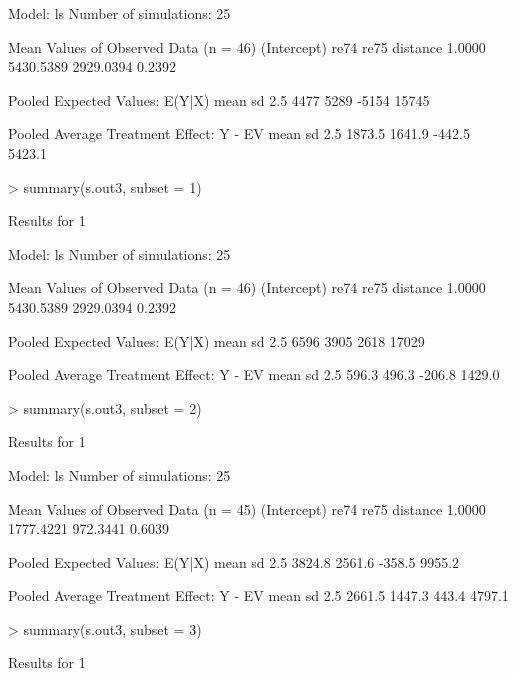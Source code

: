 \begin{enumerate}
\begin{Schunk}
\begin{Soutput}
  Model: ls 
  Number of simulations: 25 

Mean Values of Observed Data (n = 46) 
(Intercept)        re74        re75    distance 
     1.0000   5430.5389   2929.0394      0.2392 

Pooled Expected Values: E(Y|X)
 mean    sd  2.5% 97.5% 
 4477  5289 -5154 15745 

Pooled Average Treatment Effect: Y - EV
  mean     sd   2.5%  97.5% 
1873.5 1641.9 -442.5 5423.1 

\end{Soutput}
\begin{Sinput}
> summary(s.out3, subset = 1)
\end{Sinput}
\begin{Soutput}

Results for 1 

  Model: ls 
  Number of simulations: 25 

Mean Values of Observed Data (n = 46) 
(Intercept)        re74        re75    distance 
     1.0000   5430.5389   2929.0394      0.2392 

Pooled Expected Values: E(Y|X)
 mean    sd  2.5% 97.5% 
 6596  3905  2618 17029 

Pooled Average Treatment Effect: Y - EV
  mean     sd   2.5%  97.5% 
 596.3  496.3 -206.8 1429.0 


\end{Soutput}
\begin{Sinput}
> summary(s.out3, subset = 2)
\end{Sinput}
\begin{Soutput}

Results for 1 

  Model: ls 
  Number of simulations: 25 

Mean Values of Observed Data (n = 45) 
(Intercept)        re74        re75    distance 
     1.0000   1777.4221    972.3441      0.6039 

Pooled Expected Values: E(Y|X)
  mean     sd   2.5%  97.5% 
3824.8 2561.6 -358.5 9955.2 

Pooled Average Treatment Effect: Y - EV
  mean     sd   2.5%  97.5% 
2661.5 1447.3  443.4 4797.1 


\end{Soutput}
\begin{Sinput}
> summary(s.out3, subset = 3)
\end{Sinput}
\begin{Soutput}

Results for 1 


\end{Soutput}
\end{Schunk}
\end{enumerate}
